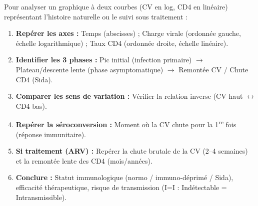 \documentclass[11pt]{article}
\begin{document}
\begin{methode}
Pour analyser un graphique à deux courbes (CV en log, CD4 en linéaire) représentant l'histoire naturelle ou le suivi sous traitement :
\begin{enumerate}
    \item \textbf{Repérer les axes :} Temps (abscisses) ; Charge virale (ordonnée gauche, échelle logarithmique) ; Taux CD4 (ordonnée droite, échelle linéaire).
    \item \textbf{Identifier les 3 phases :} Pic initial (infection primaire) $\to$ Plateau/descente lente (phase asymptomatique) $\to$ Remontée CV / Chute CD4 (Sida).
    \item \textbf{Comparer les sens de variation :} Vérifier la relation inverse (CV haut $\leftrightarrow$ CD4 bas).
    \item \textbf{Repérer la séroconversion :} Moment où la CV chute pour la 1\textsuperscript{re} fois (réponse immunitaire).
    \item \textbf{Si traitement (ARV) :} Repérer la chute brutale de la CV (2--4 semaines) et la remontée lente des CD4 (mois/années).
    \item \textbf{Conclure :} Statut immunologique (normo / immuno-déprimé / Sida), efficacité thérapeutique, risque de transmission (I=I : Indétectable = Intransmissible).
\end{enumerate}
\end{methode}
\end{document}
